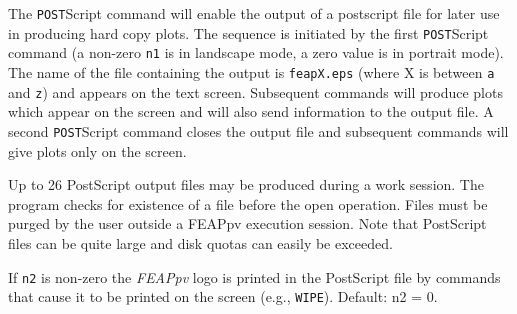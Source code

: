 \headb

The {\tt POST}Script command will enable the output of a
postscript file for later use in producing hard copy plots.
The sequence is initiated by the first {\tt POST}Script command (a
non-zero {\tt n1} is in landscape mode, a zero value is in portrait mode).
The name of the file
containing the output is {\tt feapX.eps} (where X is between
{\tt a} and {\tt z}) and appears on the text screen.  Subsequent
commands will produce plots which appear on the screen and will also
send information to the output file.  A second {\tt POST}Script command
closes the output file and subsequent commands will
give plots only on the screen.

Up to 26 PostScript output files may be produced during
a work session.  The program checks for existence of a file
before the open operation.  Files must be purged by the user
outside a FEAPpv execution session.  Note that PostScript
files can be quite large and disk quotas can easily be
exceeded.

If {\tt n2} is non-zero the {\sl FEAPpv} logo is printed in the
PostScript file by commands that cause it to be printed on
the screen (e.g., {\tt WIPE}).  Default: n2 = 0.
\vfill
\eject

